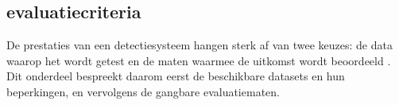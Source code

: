 \subsection{evaluatiecriteria}
\label{subsec:evaluatiecriteria}

De prestaties van een detectiesysteem hangen sterk af van twee keuzes: de data waarop het wordt getest en de maten waarmee de uitkomst wordt beoordeeld \autocite{Salloum2022}. Dit onderdeel bespreekt daarom eerst de beschikbare datasets en hun beperkingen, en vervolgens de gangbare evaluatiematen.


